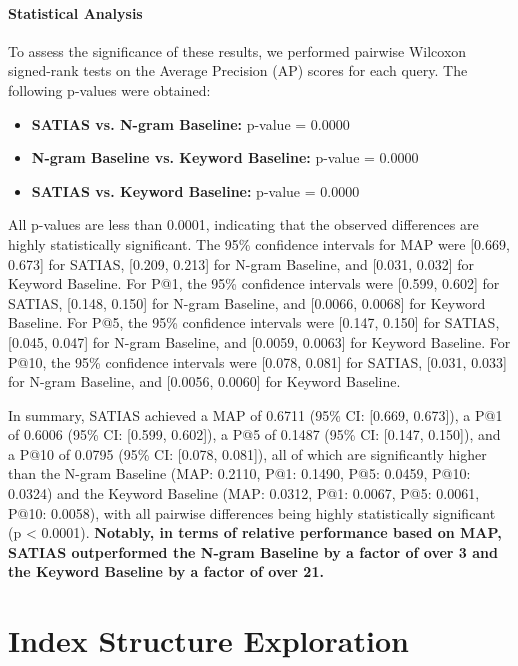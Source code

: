\documentclass[manuscript,screen]{acmart}
\begin{document}
\paragraph{Statistical Analysis}

To assess the significance of these results, we performed pairwise Wilcoxon signed-rank tests on the Average Precision (AP) scores for each query. The following p-values were obtained:

\begin{itemize}
    \item \textbf{SATIAS vs. N-gram Baseline:} p-value = 0.0000
    \item \textbf{N-gram Baseline vs. Keyword Baseline:} p-value = 0.0000
    \item \textbf{SATIAS vs. Keyword Baseline:} p-value = 0.0000
\end{itemize}

All p-values are less than 0.0001, indicating that the observed differences are highly statistically significant. The 95\% confidence intervals for MAP were [0.669, 0.673] for SATIAS, [0.209, 0.213] for N-gram Baseline, and [0.031, 0.032] for Keyword Baseline. For P@1, the 95\% confidence intervals were [0.599, 0.602] for SATIAS, [0.148, 0.150] for N-gram Baseline, and [0.0066, 0.0068] for Keyword Baseline. For P@5, the 95\% confidence intervals were [0.147, 0.150] for SATIAS, [0.045, 0.047] for N-gram Baseline, and [0.0059, 0.0063] for Keyword Baseline. For P@10, the 95\% confidence intervals were [0.078, 0.081] for SATIAS, [0.031, 0.033] for N-gram Baseline, and [0.0056, 0.0060] for Keyword Baseline.

In summary, SATIAS achieved a MAP of 0.6711 (95\% CI: [0.669, 0.673]), a P@1 of 0.6006 (95\% CI: [0.599, 0.602]), a P@5 of 0.1487 (95\% CI: [0.147, 0.150]), and a P@10 of 0.0795 (95\% CI: [0.078, 0.081]), all of which are significantly higher than the N-gram Baseline (MAP: 0.2110, P@1: 0.1490, P@5: 0.0459, P@10: 0.0324) and the Keyword Baseline (MAP: 0.0312, P@1: 0.0067, P@5: 0.0061, P@10: 0.0058), with all pairwise differences being highly statistically significant (p < 0.0001).
\textbf{Notably, in terms of relative performance based on MAP, SATIAS outperformed the N-gram Baseline by a factor of over 3 and the Keyword Baseline by a factor of over 21.}

\section{Index Structure Exploration}
\label{sec:index_exploration}
\end{document}
